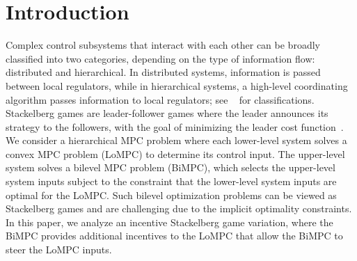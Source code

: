 \section{Introduction}
\label{sec:introduction}


Complex control subsystems that interact with each other can be broadly classified into two categories, depending on the type of information flow: distributed and hierarchical.
In distributed systems, information is passed between local regulators, while in hierarchical systems, a high-level coordinating algorithm passes information to local regulators; see ~\cite{scattolini2009architectures} for classifications.
Stackelberg games are leader-follower games where the leader announces its strategy to the followers, with the goal of minimizing the leader cost function~\cite{simaan1973stackelberg}.
We consider a hierarchical MPC problem where each lower-level system solves a convex MPC problem (LoMPC) to determine its control input.
The upper-level system solves a bilevel MPC problem (BiMPC), which selects the upper-level system inputs subject to the constraint that the lower-level system inputs are optimal for the LoMPC.
Such bilevel optimization problems can be viewed as Stackelberg games and are challenging due to the implicit optimality constraints.
In this paper, we analyze an incentive Stackelberg game variation, where the BiMPC provides additional incentives to the LoMPC that allow the BiMPC to steer the LoMPC inputs.


